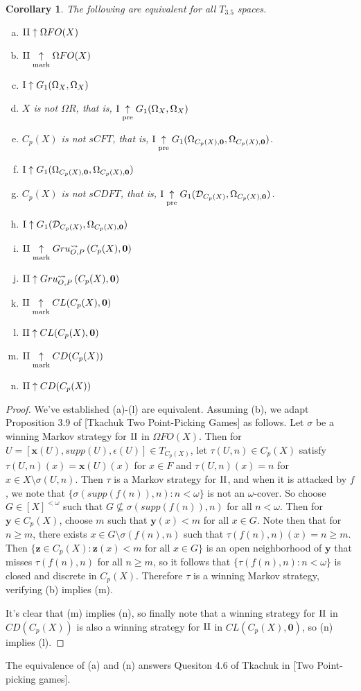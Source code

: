 \documentclass[11pt]{article}
\theoremstyle{plain}
\newtheorem{corollary}[theorem]{Corollary}
\theoremstyle{definition}
\theoremstyle{remark}
\theoremstyle{plain}
\theoremstyle{definition}
\theoremstyle{remark}
\begin{document}
\begin{corollary}
The following are equivalent for all \(T_{3.5}\) spaces.
\begin{enumerate}[a)]
\item \(\mathrm{II}\uparrow \Omega FO(X)\)
\item \(\mathrm{II}\underset{\text{mark}}{\uparrow} \Omega FO(X)\)
\item \(\mathrm{I}\uparrow G_1(\Omega_X,\Omega_X)\)
\item \(X\) is not \(\Omega R\), that is, \(\mathrm{I}\underset{\text{pre}}{\uparrow} G_1(\Omega_X,\Omega_X)\)
\item \(C_p(X)\) is not \(sCFT\), that is, 
  \(\mathrm{I}\underset{\text{pre}}{\uparrow} G_{1}(\Omega_{C_p(X),\mathbf 0},\Omega_{C_p(X),\mathbf 0})\).
\item \(\mathrm{I}\uparrow G_{1}(\Omega_{C_p(X),\mathbf 0},\Omega_{C_p(X),\mathbf 0})\)
\item \(C_p(X)\) is not \(sCDFT\), that is,
  \(\mathrm{I}\underset{\text{pre}}{\uparrow} G_{1}(\mathcal{D}_{C_p(X)},\Omega_{C_p(X),\mathbf 0})\).
\item \(\mathrm{I}\uparrow G_{1}(\mathcal{D}_{C_p(X)},\Omega_{C_p(X),\mathbf 0})\)
\item \(\mathrm{II}\underset{\text{mark}}{\uparrow}Gru_{O,P}^{\leadsto}\left({C_p(X)},{\mathbf 0}\right)\)
\item \(\mathrm{II}\uparrow Gru_{O,P}^{\leadsto}\left({C_p(X)},{\mathbf 0}\right)\)
\item \(\mathrm{II}\underset{\text{mark}}{\uparrow} CL(C_p(X),\mathbf 0)\)
\item \(\mathrm{II}\uparrow CL(C_p(X),\mathbf 0)\)
\item \(\mathrm{II}\underset{\text{mark}}{\uparrow} CD(C_p(X))\)
\item \(\mathrm{II}\uparrow CD(C_p(X))\)
\end{enumerate}
\end{corollary}
\begin{proof}
We've established (a)-(l) are equivalent.
Assuming (b), we adapt Proposition 3.9 of
[Tkachuk Two Point-Picking Games] as follows.
Let \(\sigma\) be a winning Markov strategy for
\(\mathrm{II}\) in \(\Omega FO(X)\). Then for 
\(U=[\mathbf x(U),supp(U),\epsilon(U)]\in T_{C_p(X)}\),
let \(\tau(U,n)\in C_p(X)\) satisfy \(\tau(U,n)(x)=\mathbf x(U)(x)\)
for \(x\in F\) and \(\tau(U,n)(x)=n\) for 
\(x\in X\setminus\sigma(U,n)\). Then \(\tau\) is a Markov
strategy for \(\mathrm{II}\), and when it is attacked by 
\(f\), we note that \(\{\sigma(supp(f(n)),n):n<\omega\}\)
is not an \(\omega\)-cover. So choose \(G\in[X]^{<\omega}\)
such that \(G\not\subseteq\sigma(supp(f(n)),n)\) for all \(n<\omega\).
Then for \(\mathbf y\in C_p(X)\), choose \(m\) such that
\(\mathbf y(x)<m\) for all \(x\in G\). Note then that 
for \(n\geq m\), there
exists \(x\in G\setminus\sigma(f(n),n)\) such that 
\(\tau(f(n),n)(x)=n\geq m\). Then
\(\{\mathbf z\in C_p(X):\mathbf z(x)<m\text{ for all }x\in G\}\)
is an open neighborhood of \(\mathbf y\) that misses
\(\tau(f(n),n)\) for all \(n\geq m\), so
it follows that \(\{\tau(f(n),n):n<\omega\}\) is closed and
discrete in \(C_p(X)\). Therefore \(\tau\) is a winning Markov
strategy, verifying (b) implies (m).

It's clear that (m) implies (n), so finally note that
a winning strategy for \(\mathrm{II}\) in \(CD(C_p(X))\) is also
a winning strategy for \(\mathrm{II}\) in \(CL(C_p(X),\mathbf 0)\),
so (n) implies (l).
\end{proof}

The equivalence of (a) and (n) 
answers Quesiton 4.6 of Tkachuk in [Two Point-picking games].

  
  
\end{document}

